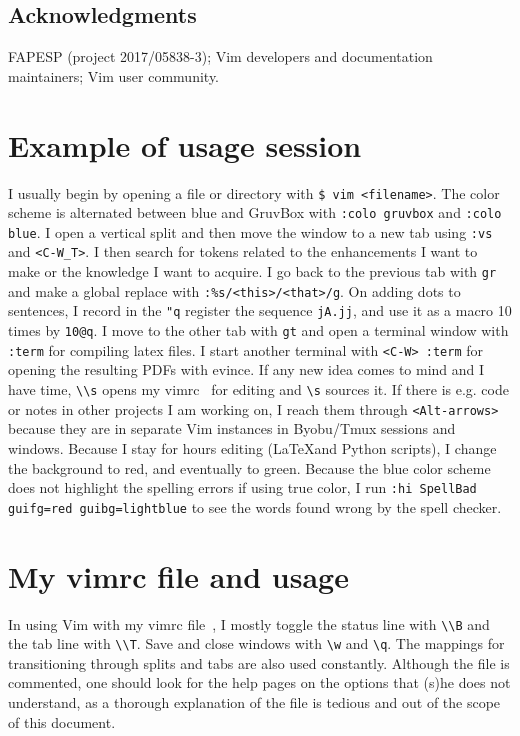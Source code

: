 \documentclass{article}
\newcommand{\ttt}[1] {
	\texttt{<#1>}}
\newcommand{\tttt}[1]{\texttt{#1}}
\begin{document}
\subsection*{Acknowledgments}
FAPESP (project 2017/05838-3); Vim developers and documentation maintainers;
Vim user community. 

\appendix
\section{Example of usage session}
I usually begin by opening a file or directory
with \tttt{\$ vim <filename>}.
The color scheme is alternated between
blue and GruvBox with
\tttt{:colo gruvbox} and \tttt{:colo blue}.
I open a vertical split and then move
the window to a new tab using
\tttt{:vs} and \ttt{C-W\_T}.
I then search for tokens related to
the enhancements I want to make or
the knowledge I want to acquire.
I go back to the previous tab with \tttt{gr}
and make a global replace with
\tttt{:\%s/<this>/<that>/g}.
On adding dots to sentences,
I record in the \tttt{"q} register
the sequence \tttt{jA.jj},
and use it as a macro 10 times by
\tttt{10@q}.
I move to the other tab with \tttt{gt}
and open a terminal window with \tttt{:term}
for compiling latex files.
I start another terminal with \tttt{<C-W> :term}
for opening the resulting PDFs with evince.
If any new idea comes to mind and I have time,
\tttt{\textbackslash\textbackslash s} opens 
my vimrc~\cite{vimrc} for editing and \tttt{\textbackslash s}
sources it.
If there is e.g. code or notes in other projects I am working
on, I reach them through \tttt{<Alt-arrows>} because they
are in separate Vim instances
in Byobu/Tmux sessions and windows.
Because I stay for hours editing (\LaTeX and Python
scripts), I change the background to red, and eventually to green.
Because the blue color scheme does not highlight the spelling errors
if using true color, I run
\tttt{:hi SpellBad guifg=red guibg=lightblue}
to see the words found wrong by the spell checker.

\section{My vimrc file and usage}
In using Vim with my vimrc file~\cite{vimrc},
I mostly toggle the status line with \texttt{\textbackslash\textbackslash B}
and the tab line with \texttt{\textbackslash\textbackslash T}.
Save and close windows with \texttt{\textbackslash w} and \texttt{\textbackslash q}.
The mappings for transitioning through splits and tabs
are also used constantly.
Although the file is commented, one should
look for the help pages on the options that (s)he does
not understand, as a thorough explanation
of the file is tedious and out of the scope
of this document.
\end{document}
